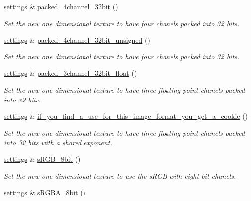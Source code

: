 \begin{DoxyCompactItemize}
\hyperlink{classgfx_1_1texture__1D_1_1settings}{settings} \& \hyperlink{classgfx_1_1texture__1D_1_1settings_a8a44c1eaa1eca30565ce92d7f3e1f23a}{packed\-\_\-4channel\-\_\-32bit} ()
\begin{DoxyCompactList}\small\item\em Set the new one dimensional texture to have four chanels packed into 32 bits. \end{DoxyCompactList}\item 
\hyperlink{classgfx_1_1texture__1D_1_1settings}{settings} \& \hyperlink{classgfx_1_1texture__1D_1_1settings_ab646dd07635ae11f036b5645adba617e}{packed\-\_\-4channel\-\_\-32bit\-\_\-unsigned} ()
\begin{DoxyCompactList}\small\item\em Set the new one dimensional texture to have four chanels packed into 32 bits. \end{DoxyCompactList}\item 
\hyperlink{classgfx_1_1texture__1D_1_1settings}{settings} \& \hyperlink{classgfx_1_1texture__1D_1_1settings_a91d4b5bdba4d0fb5081b00f582bd0770}{packed\-\_\-3channel\-\_\-32bit\-\_\-float} ()
\begin{DoxyCompactList}\small\item\em Set the new one dimensional texture to have three floating point chanels packed into 32 bits. \end{DoxyCompactList}\item 
\hyperlink{classgfx_1_1texture__1D_1_1settings}{settings} \& \hyperlink{classgfx_1_1texture__1D_1_1settings_a72ae2795c979491177eaad2876b68863}{if\-\_\-you\-\_\-find\-\_\-a\-\_\-use\-\_\-for\-\_\-this\-\_\-image\-\_\-format\-\_\-you\-\_\-get\-\_\-a\-\_\-cookie} ()
\begin{DoxyCompactList}\small\item\em Set the new one dimensional texture to have three floating point chanels packed into 32 bits with a shared exponent. \end{DoxyCompactList}\item 
\hyperlink{classgfx_1_1texture__1D_1_1settings}{settings} \& \hyperlink{classgfx_1_1texture__1D_1_1settings_aca4e4e76aee769a8afe363263f03c39f}{s\-R\-G\-B\-\_\-8bit} ()
\begin{DoxyCompactList}\small\item\em Set the new one dimensional texture to use the s\-R\-G\-B with eight bit chanels. \end{DoxyCompactList}\item 
\hyperlink{classgfx_1_1texture__1D_1_1settings}{settings} \& \hyperlink{classgfx_1_1texture__1D_1_1settings_a5c0304f8c7fc1c71d8ec17e421b2dd0d}{s\-R\-G\-B\-A\-\_\-8bit} ()

\end{DoxyCompactItemize}
